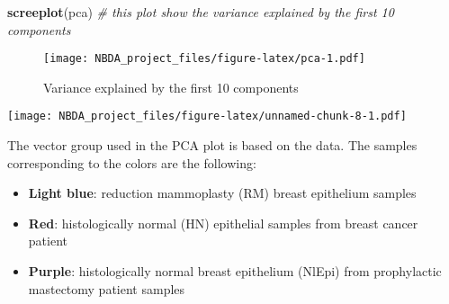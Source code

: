 \documentclass[
]{article}
\newenvironment{Shaded}{\begin{snugshade}}{\end{snugshade}}
\newcommand{\AttributeTok}[1]{\textcolor[rgb]{0.13,0.29,0.53}{#1}}
\newcommand{\CommentTok}[1]{\textcolor[rgb]{0.56,0.35,0.01}{\textit{#1}}}
\newcommand{\DecValTok}[1]{\textcolor[rgb]{0.00,0.00,0.81}{#1}}
\newcommand{\FloatTok}[1]{\textcolor[rgb]{0.00,0.00,0.81}{#1}}
\newcommand{\FunctionTok}[1]{\textcolor[rgb]{0.13,0.29,0.53}{\textbf{#1}}}
\newcommand{\NormalTok}[1]{#1}
\newcommand{\OtherTok}[1]{\textcolor[rgb]{0.56,0.35,0.01}{#1}}
\newcommand{\SpecialCharTok}[1]{\textcolor[rgb]{0.81,0.36,0.00}{\textbf{#1}}}
\newcommand{\StringTok}[1]{\textcolor[rgb]{0.31,0.60,0.02}{#1}}
\begin{document}
\begin{Shaded}
\begin{Highlighting}[]
\FunctionTok{screeplot}\NormalTok{(pca) }\CommentTok{\# this plot show the variance explained by the first 10 components}
\end{Highlighting}
\end{Shaded}

\begin{figure}
\centering
\texttt{[image: NBDA\_project\_files/figure-latex/pca-1.pdf]}
\caption{Variance explained by the first 10 components}
\end{figure}

\begin{Shaded}
\end{Shaded}

\texttt{[image: NBDA\_project\_files/figure-latex/unnamed-chunk-8-1.pdf]}

The vector group used in the PCA plot is based on the data. The samples
corresponding to the colors are the following:

\begin{itemize}
\item
  \textbf{Light blue}: reduction mammoplasty (RM) breast epithelium
  samples
\item
  \textbf{Red}: histologically normal (HN) epithelial samples from
  breast cancer patient
\item
  \textbf{Purple}: histologically normal breast epithelium (NlEpi) from
  prophylactic mastectomy patient samples
\end{itemize}
\end{document}
